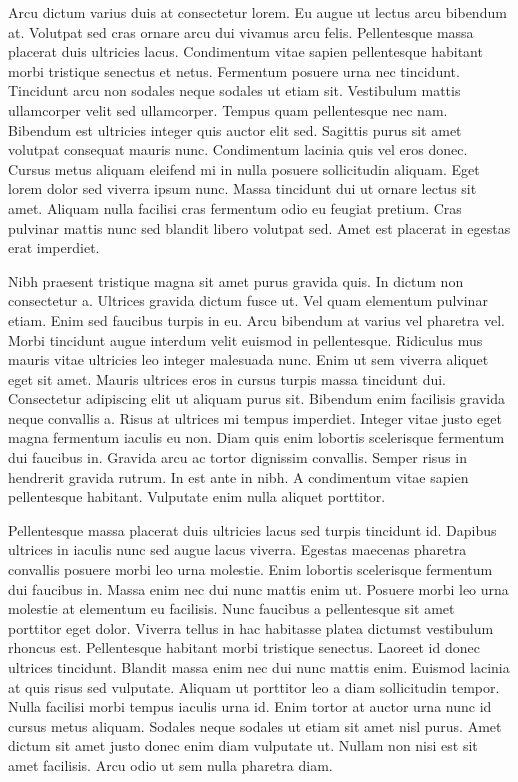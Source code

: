 \documentclass[11pt,a4paper]{article}
\begin{document}
Arcu dictum varius duis at consectetur lorem. Eu augue ut lectus arcu bibendum at. Volutpat sed cras ornare arcu dui vivamus arcu felis. Pellentesque massa placerat duis ultricies lacus. Condimentum vitae sapien pellentesque habitant morbi tristique senectus et netus. Fermentum posuere urna nec tincidunt. Tincidunt arcu non sodales neque sodales ut etiam sit. Vestibulum mattis ullamcorper velit sed ullamcorper. Tempus quam pellentesque nec nam. Bibendum est ultricies integer quis auctor elit sed. Sagittis purus sit amet volutpat consequat mauris nunc. Condimentum lacinia quis vel eros donec. Cursus metus aliquam eleifend mi in nulla posuere sollicitudin aliquam. Eget lorem dolor sed viverra ipsum nunc. Massa tincidunt dui ut ornare lectus sit amet. Aliquam nulla facilisi cras fermentum odio eu feugiat pretium. Cras pulvinar mattis nunc sed blandit libero volutpat sed. Amet est placerat in egestas erat imperdiet.

Nibh praesent tristique magna sit amet purus gravida quis. In dictum non consectetur a. Ultrices gravida dictum fusce ut. Vel quam elementum pulvinar etiam. Enim sed faucibus turpis in eu. Arcu bibendum at varius vel pharetra vel. Morbi tincidunt augue interdum velit euismod in pellentesque. Ridiculus mus mauris vitae ultricies leo integer malesuada nunc. Enim ut sem viverra aliquet eget sit amet. Mauris ultrices eros in cursus turpis massa tincidunt dui. Consectetur adipiscing elit ut aliquam purus sit. Bibendum enim facilisis gravida neque convallis a. Risus at ultrices mi tempus imperdiet. Integer vitae justo eget magna fermentum iaculis eu non. Diam quis enim lobortis scelerisque fermentum dui faucibus in. Gravida arcu ac tortor dignissim convallis. Semper risus in hendrerit gravida rutrum. In est ante in nibh. A condimentum vitae sapien pellentesque habitant. Vulputate enim nulla aliquet porttitor.

Pellentesque massa placerat duis ultricies lacus sed turpis tincidunt id. Dapibus ultrices in iaculis nunc sed augue lacus viverra. Egestas maecenas pharetra convallis posuere morbi leo urna molestie. Enim lobortis scelerisque fermentum dui faucibus in. Massa enim nec dui nunc mattis enim ut. Posuere morbi leo urna molestie at elementum eu facilisis. Nunc faucibus a pellentesque sit amet porttitor eget dolor. Viverra tellus in hac habitasse platea dictumst vestibulum rhoncus est. Pellentesque habitant morbi tristique senectus. Laoreet id donec ultrices tincidunt. Blandit massa enim nec dui nunc mattis enim. Euismod lacinia at quis risus sed vulputate. Aliquam ut porttitor leo a diam sollicitudin tempor. Nulla facilisi morbi tempus iaculis urna id. Enim tortor at auctor urna nunc id cursus metus aliquam. Sodales neque sodales ut etiam sit amet nisl purus. Amet dictum sit amet justo donec enim diam vulputate ut. Nullam non nisi est sit amet facilisis. Arcu odio ut sem nulla pharetra diam.
\end{document}
